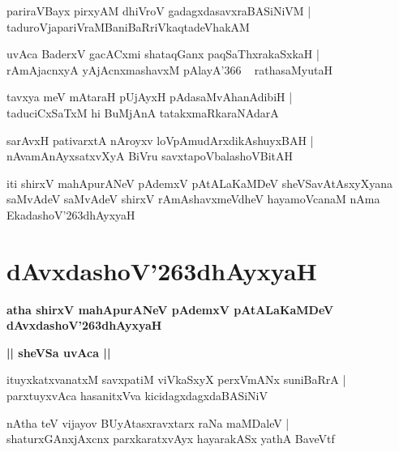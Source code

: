 \documentclass[twoside,12pt,openright]{book}
\def\S{\char'263}
\newcounter{shloka}[chapter]
\def\uvaca#1{\centerline{{\large\textbf{#1}}}}
\begin{document}
\begin{shloka}%
pariraVBayx pirxyAM dhiVroV gadagxdasavxraBASiNiVM |\\
taduroVjapariVraMBaniBaRriVkaqtadeVhakAM 
\end{shloka}

\begin{shloka}%
uvAca BaderxV gacACxmi shataqGanx paqSaThxrakaSxkaH |\\
rAmAjacnxyA yAjAcnxmashavxM pAlayA\char'366 ~ rathasaMyutaH 
\end{shloka}

\begin{shloka}%
tavxya meV mAtaraH pUjAyxH pAdasaMvAhanAdibiH |\\
taduciCxSaTxM hi BuMjAnA tatakxmaRkaraNAdarA
\end{shloka}

\begin{shloka}%
sarAvxH pativarxtA nAroyxv loVpAmudArxdikAshuyxBAH |\\
nAvamAnAyxsatxvXyA BiVru savxtapoVbalashoVBitAH
\end{shloka}

\begin{center}
iti shirxV mahApurANeV pAdemxV pAtALaKaMDeV sheVSavAtAsxyXyana saMvAdeV 
saMvAdeV shirxV rAmAshavxmeVdheV hayamoVcanaM nAma EkadashoV\S dhAyxyaH
\end{center}

\chapter{dAvxdashoV\S dhAyxyaH}

\begin{center}
{\LARGE\bfseries atha shirxV mahApurANeV pAdemxV pAtALaKaMDeV dAvxdashoV\S dhAyxyaH}
\end{center}

\uvaca{|| sheVSa uvAca ||}

\begin{shloka}%
ituyxkatxvanatxM savxpatiM viVkaSxyX perxVmANx suniBaRrA |\\
parxtuyxvAca hasanitxVva kicidagxdagxdaBASiNiV 
\end{shloka}

\begin{shloka}%
nAtha teV vijayov BUyAtasxravxtarx raNa maMDaleV |\\
shaturxGAnxjAxcnx parxkaratxvAyx hayarakASx yathA BaveVtf 
\end{shloka}
\end{document}
